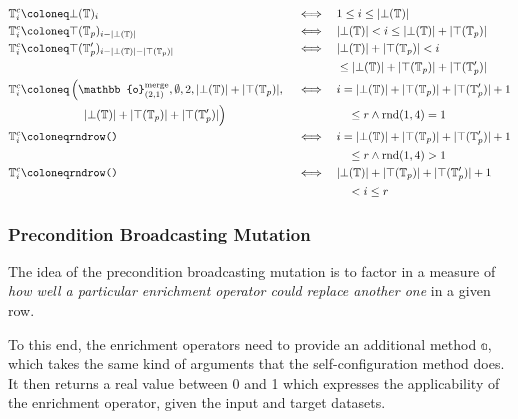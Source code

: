 \begin{equation}
  \begin{aligned}
    \mathbb{T}^c_i  \coloneq & \bot(\mathbb{T})_i  & \iff \quad & 1 \leq i \leq |\bot(\mathbb{T})| \\
    \mathbb{T}^c_i  \coloneq & \top(\mathbb{T}_p)_{i-|\bot(\mathbb{T})|}  & \iff \quad & |\bot(\mathbb{T})| < i \leq |\bot(\mathbb{T})| + |\top(\mathbb{T}_p)| \\
    \mathbb{T}^c_i \coloneq & \top(\mathbb{T}_p')_{i-|\bot(\mathbb{T})|-|\top(\mathbb{T}_p)|}  & \iff \quad & |\bot(\mathbb{T})| + |\top(\mathbb{T}_p)| < i \\
    & & & \leq |\bot(\mathbb{T})| + |\top(\mathbb{T}_p)| + |\top(\mathbb{T}_p')| \\
    \mathbb{T}^c_i \coloneq & \left(\mathbb{o}^{\text{merge}}_{(2,1)}, \emptyset, 2, |\bot(\mathbb{T})| + |\top(\mathbb{T}_p)|, \right. & \iff \quad & i = |\bot(\mathbb{T})| + |\top(\mathbb{T}_p)| + |\top(\mathbb{T}_p')| + 1 \\
    & \quad \left. \vphantom{\mathbb{o}^{\text{merge}}_{(2,1)}} |\bot(\mathbb{T})| + |\top(\mathbb{T}_p)| + |\top(\mathbb{T}_p')| \right) & & \quad \leq r \land \rnd(1,4)=1 \\
    \mathbb{T}^c_i \coloneq & \texttt{rndrow()}  & \iff \quad & i = |\bot(\mathbb{T})| + |\top(\mathbb{T}_p)| + |\top(\mathbb{T}_p')| + 1 \\
    & & & \quad \leq r \land \rnd(1,4) > 1\\
    \mathbb{T}^c_i \coloneq & \texttt{rndrow()}  & \iff \quad & |\bot(\mathbb{T})| + |\top(\mathbb{T}_p)| + |\top(\mathbb{T}_p')| + 1\\
    & & & \quad < i \leq r
  \end{aligned}
  \label{eq:semanticcrossover}
\end{equation}



\subsubsection{Precondition Broadcasting Mutation}

The idea of the precondition broadcasting mutation is to factor in a measure of \emph{how well a particular enrichment operator could replace another one} in a given row.

To this end, the enrichment operators need to provide an additional method $\mathbb{a}$, which takes the same kind of arguments that the self-configuration method does.
It then returns a real value between 0 and 1 which expresses the applicability of the enrichment operator, given the input and target datasets.\\

